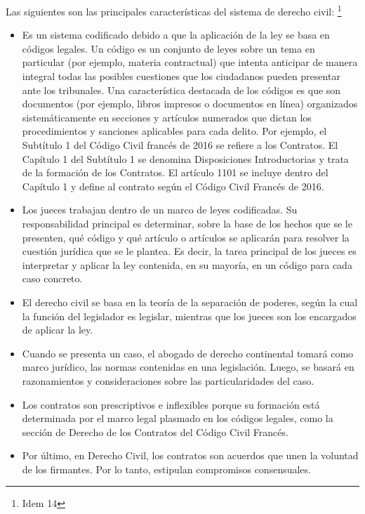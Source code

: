 \documentclass[12pt]{report} %
\begin{document}
Las siguientes son las principales características del sistema de derecho civil: \footnote{Idem 14}


\begin{itemize}
    \item Es un sistema codificado debido a que la aplicación de la ley se basa en códigos legales. Un código es un conjunto de leyes sobre un tema en particular (por ejemplo, materia contractual) que intenta anticipar de manera integral todas las posibles cuestiones que los ciudadanos pueden presentar ante los tribunales. Una característica destacada de los códigos es que son documentos (por ejemplo, libros impresos o documentos en línea) organizados sistemáticamente en secciones y artículos numerados que dictan los procedimientos y sanciones aplicables para cada delito. Por ejemplo, el Subtítulo 1 del Código Civil francés de 2016  se refiere a los Contratos. El Capítulo 1 del Subtítulo 1 se denomina Disposiciones Introductorias y trata de la formación de los Contratos. El artículo 1101 se incluye dentro del Capítulo 1 y define al contrato según el Código Civil Francés de 2016.
    \item	Los jueces trabajan dentro de un marco de leyes codificadas. Su responsabilidad principal es determinar, sobre la base de los hechos que se le presenten, qué código y qué artículo o artículos se aplicarán para resolver la cuestión jurídica que se le plantea. Es decir, la tarea principal de los jueces es interpretar y aplicar la ley contenida, en su mayoría, en un código para cada caso concreto.

    \item El derecho civil se basa en la teoría de la separación de poderes, según la cual la función del legislador es legislar, mientras que los jueces son los encargados de aplicar la ley.

    \item Cuando se presenta un caso, el abogado de derecho continental tomará como marco jurídico, las normas contenidas en una legislación. Luego, se basará en razonamientos y consideraciones sobre las particularidades del caso.

    \item Los contratos son prescriptivos e inflexibles porque su formación está determinada por el marco legal plasmado en los códigos legales, como la sección de Derecho de los Contratos del Código Civil Francés.

    \item Por último, en Derecho Civil, los contratos son acuerdos que unen la voluntad de los firmantes. Por lo tanto, estipulan compromisos consensuales.
\end{itemize}
\end{document}
